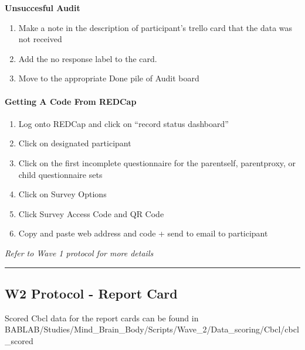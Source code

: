 \documentclass[
]{book}
\providecommand{\tightlist}{%
  \setlength{\itemsep}{0pt}\setlength{\parskip}{0pt}}
\begin{document}
\textbf{Unsuccesful Audit}

\begin{enumerate}
\def\labelenumi{\arabic{enumi})}
\item
  Make a note in the description of participant's trello card that the data was not received
\item
  Add the no response label to the card.
\item
  Move to the appropriate Done pile of Audit board
\end{enumerate}

\hypertarget{getting-a-code-from-redcap}{%
\paragraph{Getting A Code From REDCap}\label{getting-a-code-from-redcap}}

\begin{enumerate}
\def\labelenumi{\arabic{enumi}.}
\tightlist
\item
  Log onto REDCap and click on ``record status dashboard''\\
\item
  Click on designated participant\\
\item
  Click on the first incomplete questionnaire for the parentself, parentproxy, or child questionnaire sets\\
\item
  Click on Survey Options\\
\item
  Click Survey Access Code and QR Code\\
\item
  Copy and paste web address and code + send to email to participant
\end{enumerate}

\emph{Refer to Wave 1 protocol for more details}

\begin{center}\rule{0.5\linewidth}{0.5pt}\end{center}

\hypertarget{w2-protocol---report-card}{%
\subsection{W2 Protocol - Report Card}\label{w2-protocol---report-card}}

Scored Cbcl data for the report cards can be found in BABLAB/Studies/Mind\_Brain\_Body/Scripts/Wave\_2/Data\_scoring/Cbcl/cbcl\_scored
\end{document}
